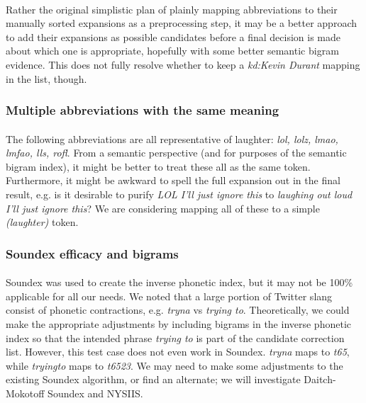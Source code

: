 \documentclass{article}
\begin{document}
\paragraph{} Rather the original simplistic plan of plainly mapping abbreviations to their manually sorted expansions as a preprocessing step, it may be a better approach to add their expansions as possible candidates before a final decision is made about which one is appropriate, hopefully with some better semantic bigram evidence. This does not fully resolve whether to keep a \textit{kd:Kevin Durant} mapping in the list, though.
\subsubsection*{Multiple abbreviations with the same meaning}
\paragraph{} The following abbreviations are all representative of laughter: \textit{lol, lolz, lmao, lmfao, lls, rofl}. From a semantic perspective (and for purposes of the semantic bigram index), it might be better to treat these all as the same token. Furthermore, it might be awkward to spell the full expansion out in the final result, e.g. is it desirable to purify \textit{LOL I'll just ignore this} to \textit{laughing out loud I'll just ignore this}? We are considering mapping all of these to a simple \textit{(laughter)} token.
\subsubsection*{Soundex efficacy and bigrams}
\paragraph{} Soundex was used to create the inverse phonetic index, but it may not be 100\% applicable for all our needs. We noted that a large portion of Twitter slang consist of phonetic contractions, e.g. \textit{tryna} vs \textit{trying to}. Theoretically, we could make the appropriate adjustments by including bigrams in the inverse phonetic index so that the intended phrase \textit{trying to} is part of the candidate correction list. However, this test case does not even work in Soundex. \textit{tryna} maps to \textit{t65}, while \textit{tryingto} maps to \textit{t6523}. We may need to make some adjustments to the existing Soundex algorithm, or find an alternate; we will investigate Daitch-Mokotoff Soundex and NYSIIS. 
\end{document}
